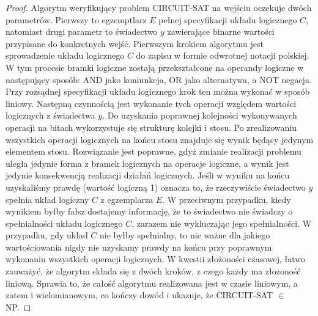 \begin{proof}
Algorytm weryfikujący problem CIRCUIT-SAT na wejściu oczekuje dwóch parametrów. Pierwszy to egzemptlarz $E$ pełnej specyfikacji układu logicznego $C$, natomiast drugi parametr to świadectwo $y$ zawierające binarne wartości przypisane do konkretnych wejść. Pierwszym krokiem algorytmu jest sprowadzenie układu logicznego $C$ do zapisu w formie odwrotnej notacji polskiej. W tym procesie bramki logiczne zostają przekształcone na operandy logiczne w następujący sposób: AND jako koniunkcja, OR jako alternatywa, a NOT negacja. Przy rozsądnej specyfikacji układu logicznego krok ten można wykonać w sposób liniowy. Następną czynnością jest wykonanie tych operacji względem wartości logicznych z świadectwa $y$. Do uzyskania poprawnej kolejności wykonywanych operacji na bitach wykorzystuje się strukturę kolejki i stosu. Po zrealizowaniu wszystkich operacji logicznych na końcu stosu znajduje się wynik będący jedynym elementem stosu. Rozwiązanie jest poprawne, gdyż zmianie realizacji problemu uległa jedynie forma z bramek logicznych na operacje logiczne, a wynik jest jedynie konsekwencją realizacji działań logicznych. Jeśli w wyniku na końcu uzyskaliśmy prawdę (wartość logiczną 1) oznacza to, że rzeczywiście świadectwo $y$ spełnia układ logiczny $C$ z egzemplarza $E$. W przeciwnym przypadku, kiedy wynikiem byłby fałsz dostajemy informację, że to świadectwo nie świadczy o spełnialności układu logicznego $C$, zarazem nie wykluczając jego spełnialności. W przypadku, gdy układ $C$ nie byłby spełnialny, to nie ważne dla jakiego wartościowania nigdy nie uzyskamy prawdy na końcu przy poprawnym wykonaniu wszystkich operacji logicznych. W kwestii złożoności czasowej, łatwo zauważyć, że algorytm składa się z dwóch kroków, z czego każdy ma złożoność liniową. Sprawia to, że całość algorytmu realizowana jest w czasie liniowym, a zatem i wielomianowym, co kończy dowód i ukazuje, że CIRCUIT-SAT $\in$ NP.
\end{proof}

